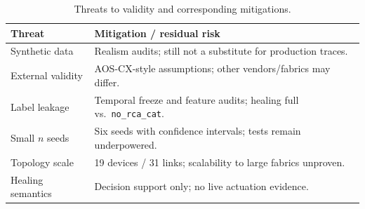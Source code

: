 \begin{table}[!t]
\centering
\caption{Threats to validity and corresponding mitigations.}
\label{tab:threats}
\renewcommand{\arraystretch}{1.2}
{\footnotesize\begin{tabular}{p{2.3cm}p{5.4cm}}
\toprule
Threat & Mitigation / residual risk \\
\midrule
Synthetic data & Realism audits; still not a substitute for production traces. \\
External validity & AOS-CX-style assumptions; other vendors/fabrics may differ. \\
Label leakage & Temporal freeze and feature audits; healing full vs.\ \texttt{no\_rca\_cat}. \\
Small $n$ seeds & Six seeds with confidence intervals; tests remain underpowered. \\
Topology scale & 19 devices / 31 links; scalability to large fabrics unproven. \\
Healing semantics & Decision support only; no live actuation evidence. \\
\bottomrule
\end{tabular}}
\end{table}
